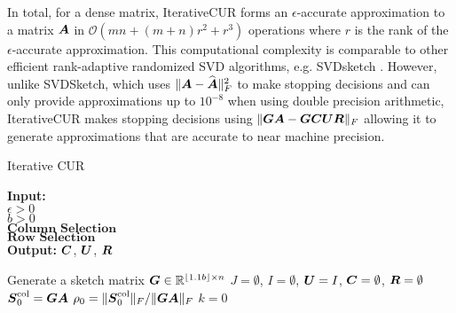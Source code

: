 In total, for a dense matrix, IterativeCUR forms an $\epsilon$-accurate approximation to a matrix $\boldsymbol{A}$ in $\mathcal{O}(mn + (m+n)r^2 + r^3)$ operations where $r$ is the rank of the $\epsilon$-accurate approximation.
This computational complexity is comparable to other efficient rank-adaptive randomized SVD algorithms, e.g. SVDsketch \cite{yu2018efficient}. However, unlike SVDSketch, which uses $\|\boldsymbol{A} - \widehat{\boldsymbol{A}}\|_F^2$ to make stopping decisions and can only provide approximations up to $10^{-8}$ when using double precision arithmetic, IterativeCUR makes stopping decisions using $\|\boldsymbol{GA} - \boldsymbol{GCUR}\|_F$ allowing it to generate approximations that are accurate to near machine precision.

\begin{algorithm}[h]
\caption{Iterative CUR}
        \hspace*{\algorithmicindent } \textbf{Input:}  \\ \hspace*{\algorithmicindent }  \quad $\epsilon > 0$ \\  \hspace*{\algorithmicindent } \quad $b > 0$ \\  \hspace*{\algorithmicindent} \quad $\textbf{Column Selection}$  \\ \hspace*{\algorithmicindent} \quad $\textbf{Row Selection}$ \\
        \hspace*{\algorithmicindent} \textbf{Output:} $\boldsymbol{C}$, $\boldsymbol{U}$, $\boldsymbol{R}$
    \label{alg:ICUR}
    \begin{algorithmic}[1]
        \State Generate a sketch matrix $ \boldsymbol{G} \in \mathbb{R}^{\lfloor 1.1b \rfloor \times n}$
        \State $J = \emptyset$, $I = \emptyset$, $\boldsymbol{U} = I$, $\boldsymbol{C} = \emptyset$, $\boldsymbol{R}=\emptyset$
        \State $ \boldsymbol{S}^{\rm col}_0 = \boldsymbol{G} \boldsymbol{A}$ \label{alg:initial-sketch}
        \State $\rho_0 = \|\boldsymbol{S}^{\rm col}_0\|_F / \|\boldsymbol{G} \boldsymbol{A}\|_F$ %
        \State $k = 0$

\end{algorithmic}
\end{algorithm}

